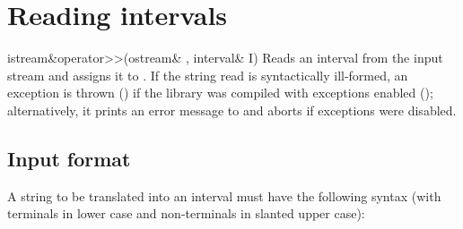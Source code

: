 \documentclass{manual}
\begin{document}
\section{Reading intervals}\label{sec:reading-intervals}

\begin{deffun}{istream\&}{operator>{}>}{(ostream\& , interval\& I)}
  Reads an interval from the input stream  and assigns it to
  .  If the string read is syntactically ill-formed, an
   exception is thrown
  () if the library was compiled with exceptions
  enabled (); alternatively, it prints an
  error message to  and aborts if exceptions were disabled.
\end{deffun}

\subsection{Input format}\label{sec:input-format}

A string to be translated into an interval must have the following
syntax (with terminals in lower case and non-terminals in slanted upper case):
\end{document}
